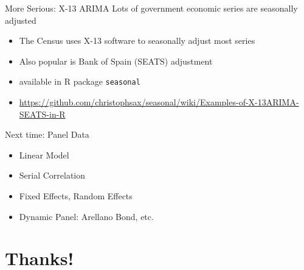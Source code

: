 \documentclass[aspectratio=169]{beamer}
\begin{document}
\begin{frame}{More Serious: X-13 ARIMA}
Lots of government economic series are \alert{seasonally adjusted}
\begin{itemize} 
\item The Census uses X-13 software to seasonally adjust most series
\item Also popular is Bank of Spain (SEATS) adjustment
\item available in R package \texttt{seasonal}
\item \url{https://github.com/christophsax/seasonal/wiki/Examples-of-X-13ARIMA-SEATS-in-R}
\end{itemize}
\end{frame}


\begin{frame}{Next time: Panel Data}
\begin{itemize} 
\item Linear Model
\item Serial Correlation
\item Fixed Effects, Random Effects
\item Dynamic Panel: Arellano Bond, etc.
\end{itemize}
\end{frame}






\section*{Thanks!}
\end{document}
